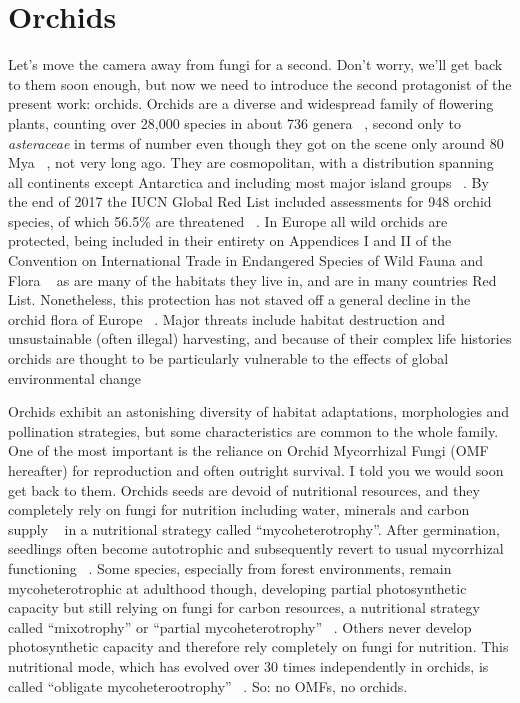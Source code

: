 \chapter{Orchids}
\label{orchids}

Let's move the camera away from fungi for a second. Don't worry, we'll get back to them soon enough, but now we need to introduce the second protagonist of the present work: orchids.
Orchids are a diverse and widespread family of flowering plants, counting over 28,000 species in about 736 genera ~\citep{christenhusz2016}, second only to \emph{asteraceae} in terms of number even though they got on the scene only around 80 Mya ~\citep{ramirez2007}, not very long ago. They are cosmopolitan, with a distribution spanning all continents except Antarctica and including most major island groups ~\citep{givnish2016}.
By the end of 2017 the IUCN Global Red List included assessments for 948 orchid species, of which 56.5\% are threatened ~\citep{fay2018}. In Europe all wild orchids are protected, being included in their entirety on Appendices I and II of the Convention on International Trade in Endangered Species of Wild Fauna and Flora ~\citep{CITES-1} as are many of the habitats they live in, and are in many countries Red List. Nonetheless, this protection has not staved off a general decline in the orchid flora of Europe ~\citep{jacquemyn2005, kull2006}. Major threats include habitat destruction and unsustainable (often illegal) harvesting, and because of their complex life histories orchids are thought to be particularly vulnerable to the effects of global environmental change ~\citep{kull2016, gale2018}

Orchids exhibit an astonishing diversity of habitat adaptations, morphologies and pollination strategies, but some characteristics are common to the whole family. One of the most important is the reliance on Orchid Mycorrhizal Fungi (OMF hereafter) for reproduction and often outright survival. I told you we would soon get back to them.
Orchids seeds are devoid of nutritional resources, and they completely rely on fungi for nutrition including water, minerals and carbon supply ~\citep{leake1994, rasmussen1998, merckx2013} in a nutritional strategy called ``mycoheterotrophy''. After germination, seedlings often become autotrophic and subsequently revert to usual mycorrhizal functioning ~\citep{rasmussen1995, cameron2008}. Some species, especially from forest environments, remain mycoheterotrophic at adulthood though, developing partial photosynthetic capacity but still relying on fungi for carbon resources, a nutritional strategy called ``mixotrophy'' or ``partial mycoheterotrophy'' ~\citep{gebauer2003, julou2005, selosse2009}. Others never develop photosynthetic capacity and therefore rely completely on fungi for nutrition. This nutritional mode, which has evolved over 30 times independently in orchids, is called ``obligate mycoheterootrophy'' ~\citep{merckx2013}. So: no OMFs, no orchids.

